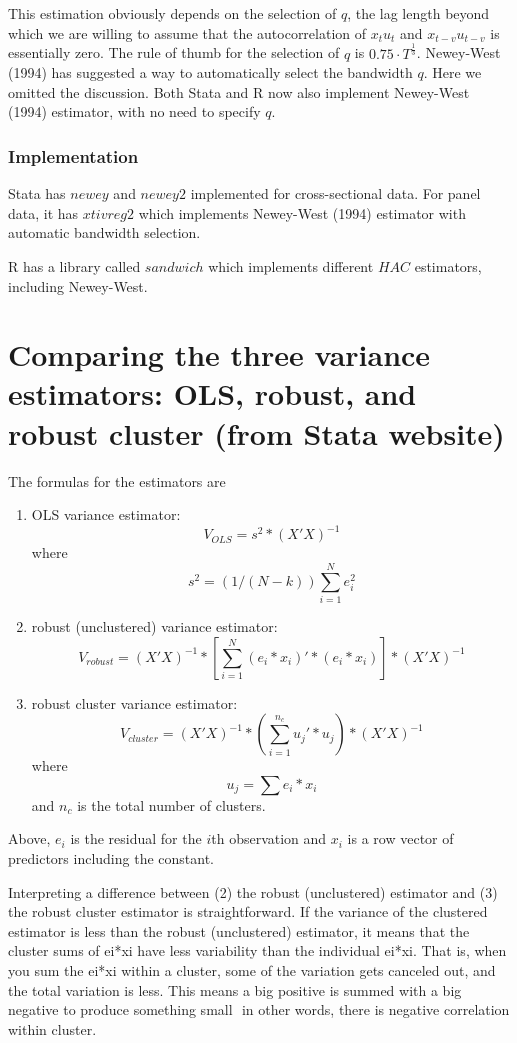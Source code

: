 This estimation obviously depends on the selection of $q$, the lag
length beyond which we are willing to assume that the autocorrelation
of $x_t u_t$ and $x_{t-v} u_{t-v}$ is essentially zero.  The rule of
thumb for the selection of $q$ is $0.75 \cdot T^{\frac{1}{3}}$.
Newey-West (1994) has suggested a way to automatically select the
bandwidth $q$.  Here we omitted the discussion.  Both Stata and R now
also implement Newey-West (1994) estimator, with no need to specify
$q$.

\subsubsection{ Implementation}

Stata has $newey$ and $newey2$ implemented for cross-sectional data.
For panel data, it has $xtivreg2$ which implements Newey-West (1994)
estimator with automatic bandwidth selection.

R has a library called $sandwich$ which implements different $HAC$
estimators, including Newey-West.


\section{Comparing the three variance estimators: OLS, robust, and robust cluster (from Stata website)}
The formulas for the estimators are

\begin{enumerate}

\item OLS variance estimator:
\[V_{OLS} = s^2 * (X'X)^{-1} \]
where
\[s^2 = (1/(N - k)) \sum_{i=1}^{N} e_i^2\]

\item robust (unclustered) variance estimator:
\[V_{robust} = (X'X)^{-1} * [ \sum_{i=1}^{N}(e_i*x_i)' * (e_i*x_i) ] * (X'X)^{-1}\]
\item robust cluster variance estimator:
\[V_{cluster} = (X'X)^{-1} * (\sum_{i=1}^{n_c} u_j'*u_j)* (X'X)^{-1}\]
where \[ u_j = \sum e_i*x_i\]  and $n_c$ is the total number of clusters.
\end{enumerate}

Above, $e_i$ is the residual for the $i$th observation and $x_i$ is a row
vector of predictors including the constant.

Interpreting a difference between (2) the robust (unclustered) estimator and
(3) the robust cluster estimator is straightforward. If the variance of the
clustered estimator is less than the robust (unclustered) estimator, it means
that the cluster sums of ei*xi have less variability than the individual ei*xi.
That is, when you sum the ei*xi within a cluster, some of the variation gets
canceled out, and the total variation is less. This means a big positive is
summed with a big negative to produce something small  in other words, there
is negative correlation within cluster.

